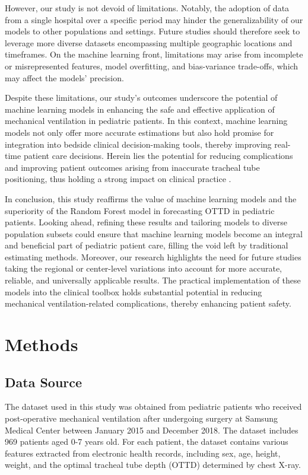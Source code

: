 \documentclass[11pt]{article}
\begin{document}
However, our study is not devoid of limitations. Notably, the adoption of data from a single hospital over a specific period may hinder the generalizability of our models to other populations and settings. Future studies should therefore seek to leverage more diverse datasets encompassing multiple geographic locations and timeframes. On the machine learning front, limitations may arise from incomplete or misrepresented features, model overfitting, and bias-variance trade-offs, which may affect the models' precision.

Despite these limitations, our study's outcomes underscore the potential of machine learning models in enhancing the safe and effective application of mechanical ventilation in pediatric patients. In this context, machine learning models not only offer more accurate estimations but also hold promise for integration into bedside clinical decision-making tools, thereby improving real-time patient care decisions. Herein lies the potential for reducing complications and improving patient outcomes arising from inaccurate tracheal tube positioning, thus holding a strong impact on clinical practice \cite{Kendirli2006MechanicalVI}.

In conclusion, this study reaffirms the value of machine learning models and the superiority of the Random Forest model in forecasting OTTD in pediatric patients. Looking ahead, refining these results and tailoring models to diverse population subsets could ensure that machine learning models become an integral and beneficial part of pediatric patient care, filling the void left by traditional estimating methods. Moreover, our research highlights the need for future studies taking the regional or center-level variations into account for more accurate, reliable, and universally applicable results. The practical implementation of these models into the clinical toolbox holds substantial potential in reducing mechanical ventilation-related complications, thereby enhancing patient safety.

\section*{Methods}

\subsection*{Data Source}
The dataset used in this study was obtained from pediatric patients who received post-operative mechanical ventilation after undergoing surgery at Samsung Medical Center between January 2015 and December 2018. The dataset includes 969 patients aged 0-7 years old. For each patient, the dataset contains various features extracted from electronic health records, including sex, age, height, weight, and the optimal tracheal tube depth (OTTD) determined by chest X-ray.
\end{document}
